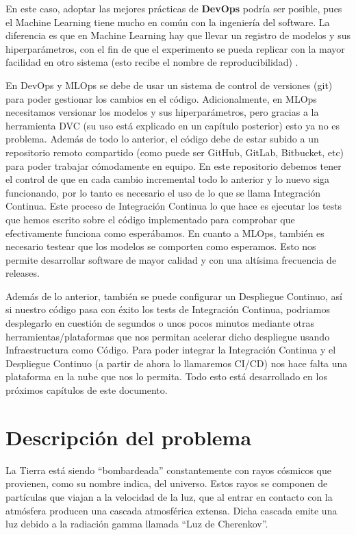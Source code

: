 En este caso, adoptar las mejores prácticas de \textbf{DevOps} podría ser posible, pues el Machine Learning tiene mucho en común con la ingeniería del software. La diferencia es que en Machine Learning hay que llevar un registro de modelos y sus hiperparámetros, con el fin de que el experimento se pueda replicar con la mayor facilidad en otro sistema (esto recibe el nombre de reproducibilidad) \cite{whymlops}.\newline

En DevOps y MLOps se debe de usar un sistema de control de versiones (git) para poder gestionar los cambios en el código. Adicionalmente, en MLOps necesitamos versionar los modelos y sus hiperparámetros, pero gracias a la herramienta DVC (su uso está explicado en un capítulo posterior) esto ya no es problema. Además de todo lo anterior, el código debe de estar subido a un repositorio remoto compartido (como puede ser GitHub, GitLab, Bitbucket, etc) para poder trabajar cómodamente en equipo. En este repositorio debemos tener el control de que en cada cambio incremental todo lo anterior y lo nuevo siga funcionando, por lo tanto es necesario el uso de lo que se llama Integración Continua. Este proceso de Integración Continua lo que hace es ejecutar los tests que hemos escrito sobre el código implementado para comprobar que efectivamente funciona como esperábamos. En cuanto a MLOps, también es necesario testear que los modelos se comporten como esperamos. Esto nos permite desarrollar software de mayor calidad y con una altísima frecuencia de releases.\newline

Además de lo anterior, también se puede configurar un Despliegue Continuo, así si nuestro código pasa con éxito los tests de Integración Continua, podriamos desplegarlo en cuestión de segundos o unos pocos minutos mediante otras herramientas/plataformas que nos permitan acelerar dicho despliegue usando Infraestructura como Código. Para poder integrar la Integración Continua y el Despliegue Continuo (a partir de ahora lo llamaremos CI/CD) nos hace falta una plataforma en la nube que nos lo permita. Todo esto está desarrollado en los próximos capítulos de este documento.

\section{Descripción del problema}

La Tierra está siendo \enquote{bombardeada} constantemente con rayos cósmicos que provienen, como su nombre indica, del universo. Estos rayos se componen de partículas que viajan a la velocidad de la luz, que al entrar en contacto con la atmósfera producen una cascada atmosférica extensa. Dicha cascada emite una luz debido a la radiación gamma llamada \enquote{Luz de Cherenkov}.\newline

